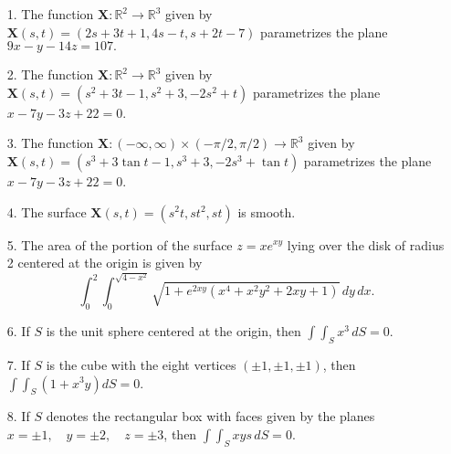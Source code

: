 \documentclass[11pt,letterpaper,boxed]{hmcpset}
\newcommand{\R}{\mathbb{R}}
\newcommand{\pn}[1]{\left( #1 \right)}
\newcommand{\VEC}[1]{\ensuremath{\mathbf{#1}}\xspace}
\begin{document}
\begin{solution}
\vfill
\end{solution}
\newpage

\begin{problem}
\begin{enumerate}
\item[1.] The function $\VEC{X}:\R^2\rightarrow\R^3$ given by $\VEC{X}(s,t) = (2s+3t+1,4s-t,s+2t-7)$ parametrizes the plane $9x-y-14z=107.$
\item[2.] The function $\VEC{X}:\R^2\rightarrow\R^3$ given by $\VEC{X}(s,t) = (s^2+3t-1,s^2+3,-2s^2+t)$ parametrizes the plane $x-7y-3z+22=0$.
\item[3.] The function $\VEC{X}:(-\infty,\infty)\times(-\pi/2,\pi/2)\rightarrow\R^3$ given by $\VEC{X}(s,t)=(s^3+3\tan t-1,s^3+3,-2s^3+\tan t)$ parametrizes the plane
$x-7y-3z+22=0$.
\item[4.] The surface $\VEC{X}(s,t)=(s^2t,st^2,st)$ is smooth.
\item[5.] The area of the portion of the surface $z=xe^{xy}$ lying over the disk of radius 2 centered at the origin is given by 
\[
	\int_0^2\int_0^{\sqrt{4-x^2}} \sqrt{1+e^{2xy}\pn{x^4+x^2y^2+2xy+1}}\,dy\,dx.
\]
\item[6.] If $S$ is the unit sphere centered at the origin, then $\int\int_Sx^3\,dS=0$.
\item[7.] If $S$ is the cube with the eight vertices $(\pm1,\pm1,\pm1)$, then $\int\int_S\pn{1+x^3y}dS=0$.
\item[8.] If $S$ denotes the rectangular box with faces given by the planes $x=\pm1, \quad y=\pm2, \quad z=\pm3$, then
$\int\int_Sxys\,dS=0$.
\end{enumerate}
\end{problem}

\begin{solution}
\vfill
\end{solution}
\newpage
\end{document}
